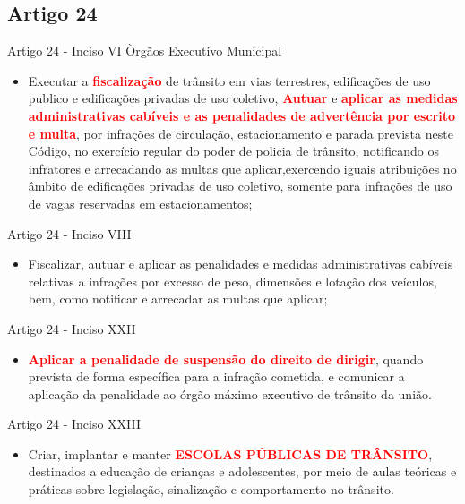 \documentclass{beamer}
\begin{document}
\subsection{Artigo 24}
\begin{frame}{Artigo 24 - Inciso VI}
Òrgãos Executivo Municipal
    \begin{itemize}
        \item \justifying Executar a \textcolor{red}{\textbf{fiscalização}} de trânsito em vias terrestres, edificações de uso publico e edificações privadas de uso coletivo,  \textcolor{red}{\textbf{Autuar}} e  \textcolor{red}{\textbf{aplicar as medidas administrativas cabíveis e as penalidades de advertência por escrito e multa}}, por infrações de circulação, estacionamento e parada prevista neste Código, no exercício regular do poder de policia de trânsito, notificando os infratores e arrecadando as multas que aplicar,exercendo iguais atribuições no âmbito de edificações privadas de uso coletivo, somente para infrações de uso de vagas reservadas em estacionamentos;
    \end{itemize}
\end{frame}
\begin{frame}{Artigo 24 - Inciso VIII}
    \begin{itemize}
        \item \justifying Fiscalizar, autuar e aplicar as penalidades e medidas administrativas cabíveis relativas a infrações por excesso de peso, dimensões e lotação dos veículos, bem, como notificar e arrecadar as multas que aplicar;
    \end{itemize}
\end{frame}
\begin{frame}{Artigo 24 - Inciso XXII}
    \begin{itemize}
        \item \justifying \textcolor{red}{\textbf{Aplicar a penalidade de suspensão do direito de dirigir}}, quando prevista de forma específica para a infração cometida, e comunicar a aplicação da penalidade ao órgão máximo executivo de trânsito da união.
    \end{itemize}
\end{frame}

\begin{frame}{Artigo 24 - Inciso XXIII}
    \begin{itemize}
        \item \justifying Criar, implantar e manter \textcolor{red}{\textbf{ESCOLAS PÚBLICAS DE TRÂNSITO}}, destinados a educação de crianças e adolescentes, por meio de aulas teóricas e práticas sobre legislação, sinalização e comportamento no trânsito.
    \end{itemize}
\end{frame}
\end{document}
